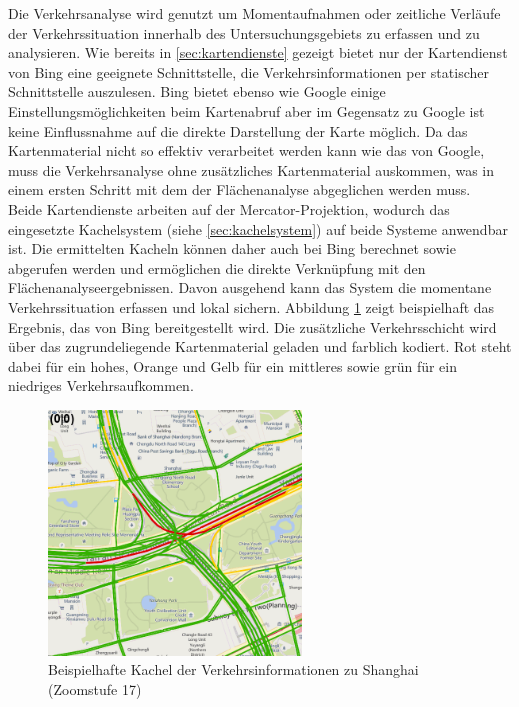 Die Verkehrsanalyse wird genutzt um Momentaufnahmen oder zeitliche Verläufe der Verkehrssituation innerhalb des Untersuchungsgebiets zu erfassen und zu analysieren. Wie bereits in \ref{sec:kartendienste} gezeigt bietet nur der Kartendienst von Bing eine geeignete Schnittstelle, die Verkehrsinformationen per statischer Schnittstelle auszulesen. Bing bietet ebenso wie Google einige Einstellungsmöglichkeiten beim Kartenabruf aber im Gegensatz zu Google ist keine Einflussnahme auf die direkte Darstellung der Karte möglich. Da das Kartenmaterial nicht so effektiv verarbeitet werden kann wie das von Google, muss die Verkehrsanalyse ohne zusätzliches Kartenmaterial auskommen, was in einem ersten Schritt mit dem der Flächenanalyse abgeglichen werden muss.\\

Beide Kartendienste arbeiten auf der Mercator-Projektion, wodurch das eingesetzte Kachelsystem (siehe \ref{sec:kachelsystem}) auf beide Systeme anwendbar ist. Die ermittelten Kacheln können daher auch bei Bing berechnet sowie abgerufen werden und ermöglichen die direkte Verknüpfung mit den Flächenanalyseergebnissen. Davon ausgehend kann das System die momentane Verkehrssituation erfassen und lokal sichern. Abbildung \ref{fig:shanghai_traffic} zeigt beispielhaft das Ergebnis, das von Bing bereitgestellt wird. Die zusätzliche Verkehrsschicht wird über das zugrundeliegende Kartenmaterial geladen und farblich kodiert. Rot steht dabei für ein hohes, Orange und Gelb für ein mittleres sowie grün für ein niedriges Verkehrsaufkommen.


\begin{figure}
  \centering
    \includegraphics[width=0.6\textwidth]{images/shanghai_traffic.png}
    \caption{Beispielhafte Kachel der Verkehrsinformationen zu Shanghai (Zoomstufe 17)}
    \label{fig:shanghai_traffic}
\end{figure}

